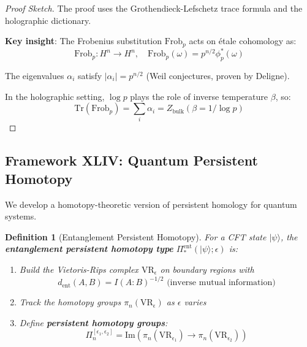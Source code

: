 \documentclass[12pt,a4paper]{article}
\newtheorem{definition}[theorem]{Definition}
\begin{document}
\begin{proof}[Proof Sketch]
The proof uses the Grothendieck-Lefschetz trace formula and the holographic dictionary.

\textbf{Key insight}: The Frobenius substitution $\text{Frob}_p$ acts on \'etale cohomology as:
\begin{equation}
\text{Frob}_p: H^n \to H^n, \quad \text{Frob}_p(\omega) = p^{n/2} \phi_p^*(\omega)
\end{equation}

The eigenvalues $\alpha_i$ satisfy $|\alpha_i| = p^{n/2}$ (Weil conjectures, proven by Deligne).

In the holographic setting, $\log p$ plays the role of inverse temperature $\beta$, so:
\begin{equation}
\text{Tr}(\text{Frob}_p) = \sum_i \alpha_i = Z_{\text{bulk}}(\beta = 1/\log p)
\end{equation}
\end{proof}

\subsection{Framework XLIV: Quantum Persistent Homotopy}

We develop a homotopy-theoretic version of persistent homology for quantum systems.

\begin{definition}[Entanglement Persistent Homotopy]\label{def:ent-persistent}
For a CFT state $|\psi\rangle$, the \textbf{entanglement persistent homotopy type} $\Pi^{\text{ent}}_*(|\psi\rangle; \epsilon)$ is:
\begin{enumerate}
    \item Build the Vietoris-Rips complex $\text{VR}_\epsilon$ on boundary regions with
    \begin{equation}
    d_{\text{ent}}(A, B) = I(A:B)^{-1/2} \text{ (inverse mutual information)}
    \end{equation}
    
    \item Track the homotopy groups $\pi_n(\text{VR}_\epsilon)$ as $\epsilon$ varies
    
    \item Define \textbf{persistent homotopy groups}:
    \begin{equation}
    \Pi_n^{[\epsilon_1, \epsilon_2]} = \text{Im}(\pi_n(\text{VR}_{\epsilon_1}) \to \pi_n(\text{VR}_{\epsilon_2}))
    \end{equation}
\end{enumerate}
\end{definition}
\end{document}
